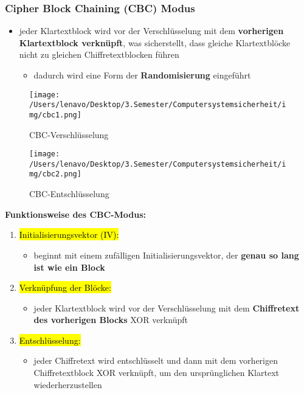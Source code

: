 \documentclass[a4paper, 10pt]{article}
\begin{document}
\subsubsection{Cipher Block Chaining (CBC) Modus}
\begin{itemize}
    \item jeder Klartextblock wird vor der Verschlüsselung mit dem \textbf{vorherigen Klartextblock verknüpft}, was sicherstellt, dass gleiche Klartextblöcke nicht zu gleichen Chiffretextblocken führen
    \begin{itemize}
        \item dadurch wird eine Form der \textbf{Randomisierung} eingeführt
    \end{itemize}
\end{itemize}
\begin{figure}[h]
    \centering
    \texttt{[image: /Users/lenavo/Desktop/3.Semester/Computersystemsicherheit/img/cbc1.png]}
    \caption{CBC-Verschlüsselung}
    \label{fig:enter-label}
\end{figure}\newpage
\begin{figure}[h]
    \centering
    \texttt{[image: /Users/lenavo/Desktop/3.Semester/Computersystemsicherheit/img/cbc2.png]}
    \caption{CBC-Entschlüsselung}
    \label{fig:enter-label}
\end{figure}
\noindent\textbf{Funktionsweise des CBC-Modus:}
\begin{enumerate}
    \item \hl{Initialisierungsvektor (IV):}
    \begin{itemize}
        \item beginnt mit einem zufälligen Initialisierungsvektor, der \textbf{genau so lang ist wie ein Block}
    \end{itemize}

    \item \hl{Verknüpfung der Blöcke:}
    \begin{itemize}
        \item jeder Klartextblock wird vor der Verschlüsselung mit dem \textbf{Chiffretext des vorherigen Blocks} XOR verknüpft
    \end{itemize}

    \item \hl{Entschlüsselung:}
    \begin{itemize}
        \item jeder Chiffretext wird entschlüsselt und dann mit dem vorherigen Chiffretextblock XOR verknüpft, um den ursprünglichen Klartext wiederherzustellen
    \end{itemize}
\end{enumerate}
\end{document}
